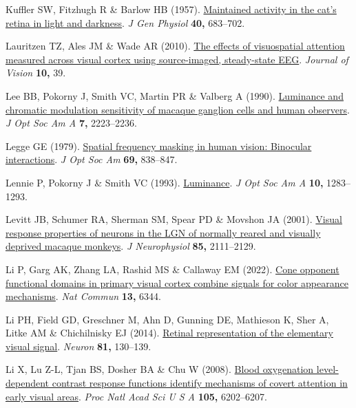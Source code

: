 \documentclass[
  letterpaper,
  DIV=11,
  numbers=noendperiod]{scrartcl}
\newlength{\cslhangindent}
\newenvironment{CSLReferences}[2] %
 {\begin{list}{}{%
  \setlength{\itemindent}{0pt}
  \setlength{\leftmargin}{0pt}
  \setlength{\parsep}{0pt}
  \ifodd #1
   \setlength{\leftmargin}{\cslhangindent}
   \setlength{\itemindent}{-1\cslhangindent}
  \fi
  \setlength{\itemsep}{#2\baselineskip}}}
 {\end{list}}
\begin{document}
\begin{CSLReferences}{1}{1}
Kuffler SW, Fitzhugh R \& Barlow HB (1957).
\href{https://doi.org/10.1085/jgp.40.5.683}{Maintained activity in the
cat's retina in light and darkness}. \emph{J Gen Physiol} \textbf{40,}
683--702.

Lauritzen TZ, Ales JM \& Wade AR (2010).
\href{https://doi.org/10.1167/10.14.39}{The effects of visuospatial
attention measured across visual cortex using source-imaged,
steady-state {EEG}}. \emph{Journal of Vision} \textbf{10,} 39.

Lee BB, Pokorny J, Smith VC, Martin PR \& Valberg A (1990).
\href{https://doi.org/10.1364/josaa.7.002223}{Luminance and chromatic
modulation sensitivity of macaque ganglion cells and human observers}.
\emph{J Opt Soc Am A} \textbf{7,} 2223--2236.

Legge GE (1979). \href{https://doi.org/10.1364/josa.69.000838}{Spatial
frequency masking in human vision: Binocular interactions}. \emph{J Opt
Soc Am} \textbf{69,} 838--847.

Lennie P, Pokorny J \& Smith VC (1993).
\href{https://doi.org/10.1364/josaa.10.001283}{Luminance}. \emph{J Opt
Soc Am A} \textbf{10,} 1283--1293.

Levitt JB, Schumer RA, Sherman SM, Spear PD \& Movshon JA (2001).
\href{https://doi.org/10.1152/jn.2001.85.5.2111}{Visual response
properties of neurons in the LGN of normally reared and visually
deprived macaque monkeys}. \emph{J Neurophysiol} \textbf{85,}
2111--2129.

Li P, Garg AK, Zhang LA, Rashid MS \& Callaway EM (2022).
\href{https://doi.org/10.1038/s41467-022-34020-2}{Cone opponent
functional domains in primary visual cortex combine signals for color
appearance mechanisms}. \emph{Nat Commun} \textbf{13,} 6344.

Li PH, Field GD, Greschner M, Ahn D, Gunning DE, Mathieson K, Sher A,
Litke AM \& Chichilnisky EJ (2014).
\href{https://doi.org/10.1016/j.neuron.2013.10.043}{Retinal
representation of the elementary visual signal}. \emph{Neuron}
\textbf{81,} 130--139.

Li X, Lu Z-L, Tjan BS, Dosher BA \& Chu W (2008).
\href{https://doi.org/10.1073/pnas.0801390105}{Blood oxygenation
level-dependent contrast response functions identify mechanisms of
covert attention in early visual areas}. \emph{Proc Natl Acad Sci U S A}
\textbf{105,} 6202--6207.


\end{CSLReferences}
\end{document}
